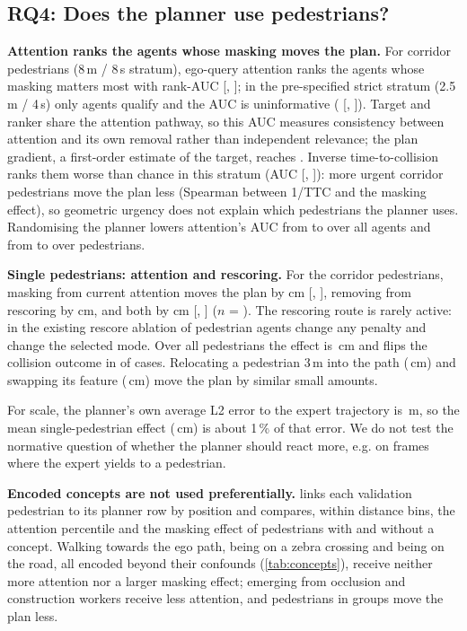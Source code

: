 \documentclass[journal]{IEEEtran}
\newcommand{\RQ}[1]{\textbf{RQ#1}}
\begin{document}
\subsection{\RQ4: Does the planner use pedestrians?}\label{sec:rq4}
\textbf{Attention ranks the agents whose masking moves the plan.} For corridor pedestrians (8\,m / 8\,s stratum),
ego-query attention ranks the agents whose masking matters most with rank-AUC \AucAttn{} [\AucAttnLo, \AucAttnHi];
in the pre-specified strict stratum (2.5\,m / 4\,s) only \AucStrictN{} agents qualify and the AUC is uninformative
(\AucStrict{} [\AucStrictLo, \AucStrictHi]). Target and ranker share the attention pathway, so this AUC measures
consistency between attention and its own removal rather than independent relevance; the plan gradient, a first-order estimate of
the target, reaches \AucGrad. Inverse time-to-collision ranks them worse than chance in this stratum (AUC \AucPhys{}
[\AucPhysLo, \AucPhysHi]): more urgent corridor pedestrians move the plan less (Spearman \PhysRho{} between
1/TTC and the masking effect), so geometric urgency does not explain which pedestrians the planner uses. Randomising the planner lowers attention's AUC from \RandAllT{} to \RandAllR{} over all
agents and from \RandPedT{} to \RandPedR{} over pedestrians.

\textbf{Single pedestrians: attention and rescoring.} For the corridor pedestrians, masking from current attention moves the
plan by \SiAttn{} cm [\SiAttnLo, \SiAttnHi], removing from rescoring by \SiRs{} cm, and both by \SiBoth{} cm
[\SiBothLo, \SiBothHi] ($n$ = \SiN). The rescoring route is rarely active: in the existing rescore ablation \RsPen{} of
\RsN{} pedestrian agents change any penalty and \RsSel{} change the selected mode. Over all pedestrians the effect is
\MaskPedCm\,cm and flips the collision outcome in \MaskPedFlips{} of \MaskPedN{} cases. Relocating a pedestrian 3\,m
into the path (\RelocInto\,cm) and swapping its feature (\RelocSwap\,cm) move the plan by similar small amounts.

For scale, the planner's own average L2 error to the expert trajectory is \PlanLtwo\,m, so the mean single-pedestrian effect
(\ClsPedMean\,cm) is about 1\,\% of that error. We do not test the normative question of whether the planner should react more, e.g.
on frames where the expert yields to a pedestrian.

\textbf{Encoded concepts are not used preferentially.}  links each validation pedestrian to
its planner row by position and compares, within distance bins, the attention percentile and the masking effect of
pedestrians with and without a concept. Walking towards the ego path, being on a zebra crossing and being on the road,
all encoded beyond their confounds (\cref{tab:concepts}), receive neither more attention nor a larger masking effect;
emerging from occlusion and construction workers receive less attention, and pedestrians in groups move the plan less.
\end{document}
